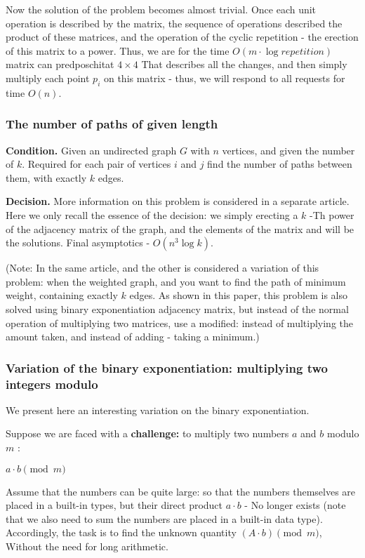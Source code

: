 Now the solution of the problem becomes almost trivial. Once each unit operation is described by the matrix, the sequence of operations described the product of these matrices, and the operation of the cyclic repetition - the erection of this matrix to a power. Thus, we are for the time $O (m \cdot \log repetition)$ matrix can predposchitat $4 \times 4$ That describes all the changes, and then simply multiply each point $p_i$ on this matrix - thus, we will respond to all requests for time $O (n)$.

\subsubsection{ The number of paths of given length }

\textbf{Condition.} Given an undirected graph $G$ with $n$ vertices, and given the number of $k$. Required for each pair of vertices $i$ and $j$ find the number of paths between them, with exactly $k$ edges.

\textbf{Decision.} More information on this problem is considered in a separate article. Here we only recall the essence of the decision: we simply erecting a $k$ -Th power of the adjacency matrix of the graph, and the elements of the matrix and will be the solutions. Final asymptotics - $O (n ^ 3 \log k)$.

(Note: In the same article, and the other is considered a variation of this problem: when the weighted graph, and you want to find the path of minimum weight, containing exactly $k$ edges. As shown in this paper, this problem is also solved using binary exponentiation adjacency matrix, but instead of the normal operation of multiplying two matrices, use a modified: instead of multiplying the amount taken, and instead of adding - taking a minimum.)

\subsubsection{ Variation of the binary exponentiation: multiplying two integers modulo }

We present here an interesting variation on the binary exponentiation.

Suppose we are faced with a \textbf{challenge:} to multiply two numbers $a$ and $b$ modulo $m$ :

$a \cdot b \pmod m$

Assume that the numbers can be quite large: so that the numbers themselves are placed in a built-in types, but their direct product $a \cdot b$ - No longer exists (note that we also need to sum the numbers are placed in a built-in data type). Accordingly, the task is to find the unknown quantity $(A \cdot b) \pmod m$, Without the need for long arithmetic.

